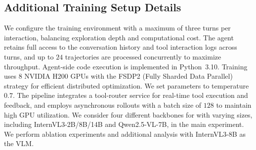\subsection{Additional Training Setup Details}
We configure the training environment with a maximum of three turns per interaction, balancing exploration depth and computational cost. The agent retains full access to the conversation history and tool interaction logs across turns, and up to $24$ trajectories are processed concurrently to maximize throughput.
Agent-side code execution is implemented in Python~3.10.
Training uses $8$ NVIDIA H200 GPUs with the FSDP2 (Fully Sharded Data Parallel) strategy for efficient distributed optimization. We set parameters to temperature $0.7$. The pipeline integrates a tool-router service for real-time tool execution and feedback, and employs asynchronous rollouts with a batch size of $128$ to maintain high GPU utilization.
We consider four different backbones for \ours{} with varying sizes, including InternVL3-2B/8B/14B and Qwen2.5-VL-7B, in the main experiment.
We perform ablation experiments and additional analysis with InternVL3-8B as the VLM. 

